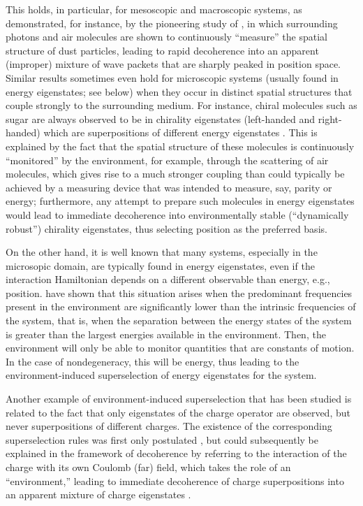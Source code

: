 \documentclass[twocolumn,rmp,aps,amsmath,amsfonts,noshowkeys,noshowpacs]{revtex4}
\begin{document}
This holds, in particular, for mesoscopic and macroscopic systems, as
demonstrated, for instance, by the pioneering study of
\citet{Joos:1985:iu}, in which surrounding photons and air molecules
are shown to continuously ``measure'' the spatial structure of dust
particles, leading to rapid decoherence into an apparent (improper)
mixture of wave packets that are sharply peaked in position space.
Similar results sometimes even hold for microscopic systems (usually
found in energy eigenstates; see below) when they occur in distinct
spatial structures that couple strongly to the surrounding medium. For
instance, chiral molecules such as sugar are always observed to be in
chirality eigenstates (left-handed and right-handed) which are
superpositions of different energy eigenstates
\citep{Harris:1981:rc,Zeh:1999:qr}.  This is explained by the fact
that the spatial structure of these molecules is continuously
``monitored'' by the environment, for example, through the scattering
of air molecules, which gives rise to a much stronger coupling than
could typically be achieved by a measuring device that was intended to
measure, say, parity or energy; furthermore, any attempt to prepare
such molecules in energy eigenstates would lead to immediate
decoherence into environmentally stable (``dynamically robust'')
chirality eigenstates, thus selecting position as the preferred basis.

On the other hand, it is well known that many systems, especially in the
microsopic domain, are typically found in energy eigenstates, even if
the interaction Hamiltonian depends on a different observable than
energy, e.g., position. \citet{Paz:1999:vv} have shown that this
situation arises when the predominant frequencies  present in the
environment are significantly lower than the intrinsic frequencies of
the system, that is, when the separation between the energy states of
the system is greater than the largest energies available in the
environment. Then, the environment will only be able to monitor
quantities that are constants of motion. In the case of
nondegeneracy, this will be energy, thus leading to the
environment-induced superselection of energy eigenstates for the
system.

Another example of environment-induced superselection that has been
studied is related to the fact that only eigenstates of the charge
operator are observed, but never superpositions of different charges.
The existence of the corresponding superselection rules was first only
postulated \citep{Wick:1952:pp,Wick:1970:iz}, but could subsequently be
explained in the framework of decoherence by referring to the
interaction of the charge with its own Coulomb (far) field, which takes
the role of an ``environment,'' leading to immediate decoherence of
charge superpositions into an apparent mixture of charge eigenstates
\citep{Giulini:1995:zh,Giulini:2000:ry}.
\end{document}

